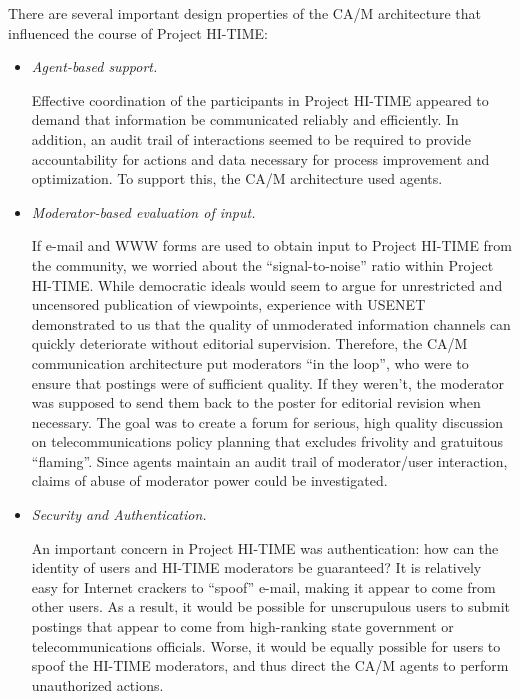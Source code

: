 There are several important design properties of the CA/M architecture
that influenced the course of Project HI-TIME:

\begin{itemize}


\item{\em Agent-based support.}

Effective coordination of the participants in Project HI-TIME 
appeared to demand that
information be communicated reliably and efficiently.  In addition, an
audit trail of interactions seemed to be required to provide
accountability for actions and data necessary for
process improvement and optimization.  To  support this,  the CA/M
architecture used agents. 

\item {\em Moderator-based evaluation of input.} 

  If e-mail and WWW forms are used to obtain input to Project HI-TIME from
  the community, we worried about the ``signal-to-noise'' ratio within
  Project HI-TIME.  While democratic ideals would seem to argue for
  unrestricted and uncensored publication of viewpoints, experience with
  USENET demonstrated to us that the quality of unmoderated information
  channels can quickly deteriorate without editorial supervision.  Therefore,
  the CA/M communication architecture put moderators ``in the loop'', who
  were to ensure that postings were of sufficient quality. If they weren't,
  the moderator was supposed to send them back to the poster for editorial
  revision when necessary.  The goal was to create a forum for serious, high
  quality discussion on telecommunications policy planning that excludes
  frivolity and gratuitous ``flaming''.  Since agents maintain an audit trail
  of moderator/user interaction, claims of abuse of moderator power could be
  investigated.


\item{\em Security and Authentication.}  

  An important concern in Project HI-TIME was authentication: how can the
  identity of users and HI-TIME moderators be guaranteed?  It is relatively
  easy for Internet crackers to ``spoof'' e-mail, making it appear to come
  from other users.  As a result, it would be possible for unscrupulous users to
  submit postings that appear to come from high-ranking state government or
  telecommunications officials. Worse, it would be  equally possible for users to
  spoof the HI-TIME moderators, and thus direct the CA/M agents to perform
  unauthorized actions.


\end{itemize}
